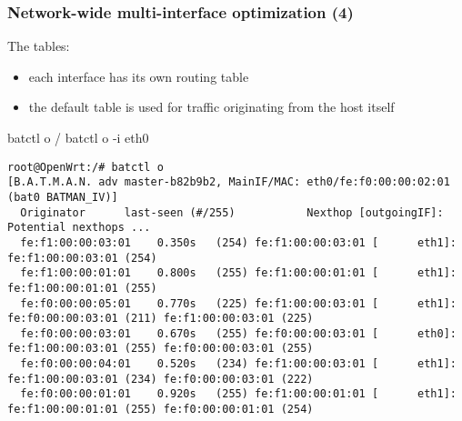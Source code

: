 \documentclass[slidestop]{beamer}
\begin{document}
\begin{frame}[c,fragile]
	\frametitle{Network-wide multi-interface optimization (4)}

	The tables:

	\begin{itemize}
		\item each interface has its own routing table
		\item the default table is used for traffic originating from the host itself
	\end{itemize}

	batctl o / batctl o -i eth0
	\begin{lstlisting}[basicstyle=\tiny]
root@OpenWrt:/# batctl o
[B.A.T.M.A.N. adv master-b82b9b2, MainIF/MAC: eth0/fe:f0:00:00:02:01 (bat0 BATMAN_IV)]
  Originator      last-seen (#/255)           Nexthop [outgoingIF]:   Potential nexthops ...
  fe:f1:00:00:03:01    0.350s   (254) fe:f1:00:00:03:01 [      eth1]: fe:f1:00:00:03:01 (254)
  fe:f1:00:00:01:01    0.800s   (255) fe:f1:00:00:01:01 [      eth1]: fe:f1:00:00:01:01 (255)
  fe:f0:00:00:05:01    0.770s   (225) fe:f1:00:00:03:01 [      eth1]: fe:f0:00:00:03:01 (211) fe:f1:00:00:03:01 (225)
  fe:f0:00:00:03:01    0.670s   (255) fe:f0:00:00:03:01 [      eth0]: fe:f1:00:00:03:01 (255) fe:f0:00:00:03:01 (255)
  fe:f0:00:00:04:01    0.520s   (234) fe:f1:00:00:03:01 [      eth1]: fe:f1:00:00:03:01 (234) fe:f0:00:00:03:01 (222)
  fe:f0:00:00:01:01    0.920s   (255) fe:f1:00:00:01:01 [      eth1]: fe:f1:00:00:01:01 (255) fe:f0:00:00:01:01 (254)


\end{lstlisting}
\end{frame}
\end{document}
